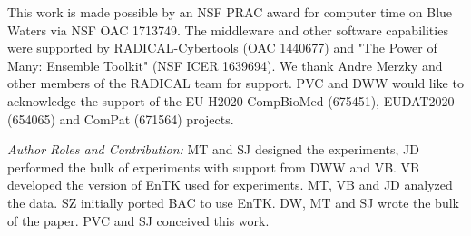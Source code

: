 \footnotesize

This work is made possible by an NSF PRAC award for computer time on Blue Waters via
NSF OAC	1713749. The middleware and other software capabilities were supported by RADICAL-Cybertools (OAC 1440677) and "The Power of Many: Ensemble Toolkit" (NSF ICER 1639694). We thank Andre Merzky and other members of the RADICAL team for support. PVC and DWW would like to acknowledge the support of the EU H2020 CompBioMed (675451), EUDAT2020 (654065) and ComPat (671564) projects.

{\it Author Roles and Contribution:} MT and SJ designed the experiments, JD
performed the bulk of experiments with support from DWW and VB. VB developed
the version of EnTK used for experiments. MT, VB and JD analyzed the data.  SZ
initially ported BAC to use EnTK. DW, MT and SJ wrote the bulk of the paper.
PVC and SJ conceived this work.










